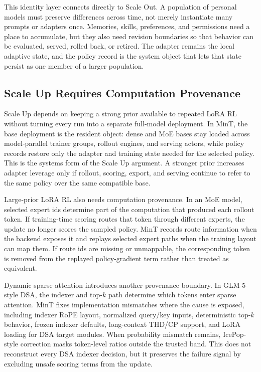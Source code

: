 \documentclass{llmxive}
\providecommand{\pony}[1]{#1}
\begin{document}
This identity layer connects directly to Scale Out. A population of personal models must preserve differences across time, not merely instantiate many prompts or adapters once. Memories, skills, preferences, and permissions need a place to accumulate, but they also need revision boundaries so that behavior can be evaluated, served, rolled back, or retired. The adapter remains the local adaptive state, and the policy record is the system object that lets that state persist as one member of a larger population.

\subsection{\pony{Scale Up Requires Computation Provenance}}\label{subsec:infra-scale-up-provenance}

Scale Up depends on keeping a strong prior available to repeated LoRA RL without turning every run into a separate full-model deployment. In MinT, the base deployment is the resident object: dense and MoE bases stay loaded across model-parallel trainer groups, rollout engines, and serving actors, while policy records restore only the adapter and training state needed for the selected policy. This is the systems form of the Scale Up argument. A stronger prior increases adapter leverage only if rollout, scoring, export, and serving continue to refer to the same policy over the same compatible base.

Large-prior LoRA RL also needs computation provenance. In an MoE model, selected expert ids determine part of the computation that produced each rollout token. If training-time scoring routes that token through different experts, the update no longer scores the sampled policy. MinT records route information when the backend exposes it and replays selected expert paths when the training layout can map them. If route ids are missing or unmappable, the corresponding token is removed from the replayed policy-gradient term rather than treated as equivalent.

Dynamic sparse attention introduces another provenance boundary. In GLM-5-style DSA, the indexer and top-$k$ path determine which tokens enter sparse attention. MinT fixes implementation mismatches where the cause is exposed, including indexer RoPE layout, normalized query/key inputs, deterministic top-$k$ behavior, frozen indexer defaults, long-context THD/CP support, and LoRA loading for DSA target modules. When probability mismatch remains, IcePop-style correction masks token-level ratios outside the trusted band. This does not reconstruct every DSA indexer decision, but it preserves the failure signal by excluding unsafe scoring terms from the update.
\end{document}

